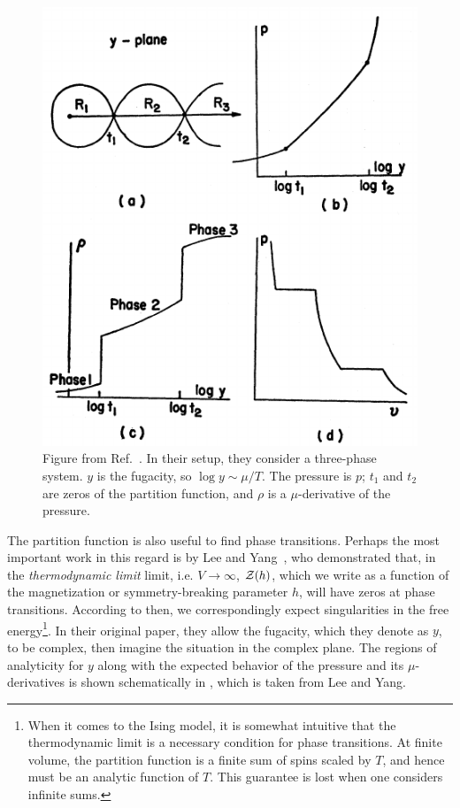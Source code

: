 \begin{figure} 
\centering
\includegraphics[width=\linewidth]{figs/lee_yang.pdf}
\caption{
Figure from Ref.~\cite{yang_statistical_1952}. In their setup, they consider a
three-phase system. $y$ is the fugacity, so $\log y\sim \mu/T$. The pressure is
$p$; $t_1$ and $t_2$ are zeros of the partition function, and $\rho$ is a
$\mu$-derivative of the pressure.
}
\label{fig:leeYangTheorem}
\end{figure}


The partition function is also useful to find
phase transitions. Perhaps the most important work in this regard is by Lee and
Yang~\cite{yang_statistical_1952}, who demonstrated that, in the 
{\it thermodynamic limit} limit, i.e.
$V\to\infty$, $\mathcal{Z}(h)$, which we write as a function of the magnetization or
symmetry-breaking parameter $h$, will have zeros at phase transitions. According
to  then, we correspondingly expect 
singularities in the free energy\footnote{When it comes to the Ising model,
it is somewhat intuitive that the thermodynamic limit is a necessary
condition for phase transitions. At finite volume, the partition function
is a finite sum of spins scaled by $T$, and hence must be an analytic
function of $T$. This guarantee is lost when one considers infinite sums.}. 
In their original paper, they allow the fugacity, which they denote
as $y$, to be complex, then imagine the situation in the complex plane.
The regions of analyticity for $y$ along with the expected behavior
of the pressure and its $\mu$-derivatives is shown schematically
in , which is taken from Lee and Yang. 


